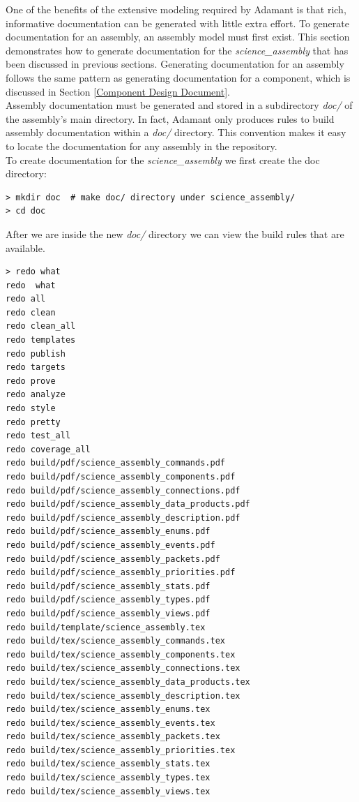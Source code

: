 One of the benefits of the extensive modeling required by Adamant is that rich, informative documentation can be generated with little extra effort. To generate documentation for an assembly, an assembly model must first exist. This section demonstrates how to generate documentation for the \textit{science\_assembly} that has been discussed in previous sections. Generating documentation for an assembly follows the same pattern as generating documentation for a component, which is discussed in Section \ref{Component Design Document}. \\

Assembly documentation must be generated and stored in a subdirectory \textit{doc/} of the assembly's main directory. In fact, Adamant only produces rules to build assembly documentation within a \textit{doc/} directory. This convention makes it easy to locate the documentation for any assembly in the repository. \\

To create documentation for the \textit{science\_assembly} we first create the doc directory:

\vspace{5mm} %
\begin{verbatim}
> mkdir doc  # make doc/ directory under science_assembly/
> cd doc
\end{verbatim}
\vspace{5mm} %

After we are inside the new \textit{doc/} directory we can view the build rules that are available.

\vspace{5mm} %
\begin{verbatim}
> redo what
redo  what
redo all
redo clean
redo clean_all
redo templates
redo publish
redo targets
redo prove
redo analyze
redo style
redo pretty
redo test_all
redo coverage_all
redo build/pdf/science_assembly_commands.pdf
redo build/pdf/science_assembly_components.pdf
redo build/pdf/science_assembly_connections.pdf
redo build/pdf/science_assembly_data_products.pdf
redo build/pdf/science_assembly_description.pdf
redo build/pdf/science_assembly_enums.pdf
redo build/pdf/science_assembly_events.pdf
redo build/pdf/science_assembly_packets.pdf
redo build/pdf/science_assembly_priorities.pdf
redo build/pdf/science_assembly_stats.pdf
redo build/pdf/science_assembly_types.pdf
redo build/pdf/science_assembly_views.pdf
redo build/template/science_assembly.tex
redo build/tex/science_assembly_commands.tex
redo build/tex/science_assembly_components.tex
redo build/tex/science_assembly_connections.tex
redo build/tex/science_assembly_data_products.tex
redo build/tex/science_assembly_description.tex
redo build/tex/science_assembly_enums.tex
redo build/tex/science_assembly_events.tex
redo build/tex/science_assembly_packets.tex
redo build/tex/science_assembly_priorities.tex
redo build/tex/science_assembly_stats.tex
redo build/tex/science_assembly_types.tex
redo build/tex/science_assembly_views.tex
\end{verbatim}
\vspace{5mm} %

